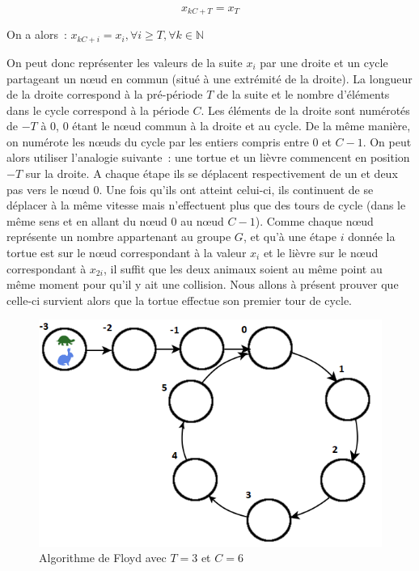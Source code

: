         \[ x_{kC+T} = x_T \]

        On a alors~: $ x_{kC+i} = x_i, \forall i \ge T, \forall k \in \mathbb{N}$

        On peut donc représenter les valeurs de la suite $x_i$ par une droite et un cycle partageant un nœud en commun (situé à une extrémité de la droite). La longueur de la droite correspond à la pré-période $T$ de la suite et le nombre d'éléments dans le cycle correspond à la période $C$. Les éléments de la droite sont numérotés de $-T$ à $0$, $0$ étant le nœud commun à la droite et au cycle. De la même manière, on numérote les nœuds du cycle par les entiers compris entre $0$ et $C-1$. On peut alors utiliser l'analogie suivante~: une tortue et un lièvre commencent en position $-T$ sur la droite. A chaque étape ils se déplacent respectivement de un et deux pas vers le nœud $0$. Une fois qu'ils ont atteint celui-ci, ils continuent de se déplacer à la même vitesse mais n'effectuent plus que des tours de cycle (dans le même sens et en allant du nœud $0$ au nœud $C-1$). Comme chaque nœud représente un nombre appartenant au groupe $G$, et qu'à une étape $i$ donnée la tortue est sur le nœud correspondant à la valeur $x_i$ et le lièvre sur le nœud correspondant à $x_{2i}$, il suffit que les deux animaux soient au même point au même moment pour qu'il y ait une collision. Nous allons à présent prouver que celle-ci survient alors que la tortue effectue son premier tour de cycle.

        \begin{figure}
          \center{}
          \includegraphics[scale=0.5]{images/Floyd.png}
          \caption{Algorithme de Floyd avec $T=3$ et $C=6$}
        \end{figure}

